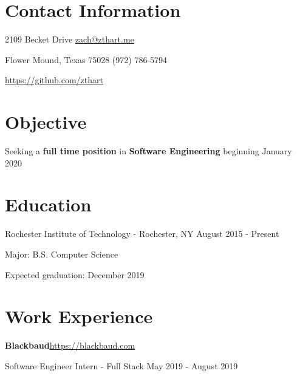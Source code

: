 \documentclass[margin,line]{resume}
\newcommand{\rurl}[1]{\hfill {\footnotesize \url{#1}}}
\newcommand{\rdate}[1]{\hfill {\small #1}}
\begin{document}
\begin{resume}
\section{\mysidestyle Contact Information}
	\begin{asparablank}
		\item 2109 Becket Drive  \hfill \href{mailto:zach@zthart.me}{zach@zthart.me}
		\item Flower Mound, Texas 75028 \hfill (972) 786-5794
		\item \hfill \rurl{https://github.com/zthart}
    \end{asparablank}

\section{\mysidestyle Objective}
	\begin{asparablank}
	\item Seeking a \textbf{full time position} in \textbf{Software Engineering} beginning January 2020
        \normalsize
        \\
	\end{asparablank}

\section{\mysidestyle Education}
	\begin{compactdesc}
		\item[Rochester Institute of Technology] - Rochester, NY \rdate{August 2015 - Present}
		\begin{compactitem} { \small
			\item Major: B.S. Computer Science
			\item Expected graduation: December 2019
		} \end{compactitem}
	\end{compactdesc}


\section{\mysidestyle Work Experience}
	\begin{asparablank}
	\item{\bf Blackbaud}\rurl{https://blackbaud.com}
	\small \item Software Engineer Intern - Full Stack \hfill May 2019 - August 2019 \\


\end{asparablank}
\end{resume}
\end{document}
